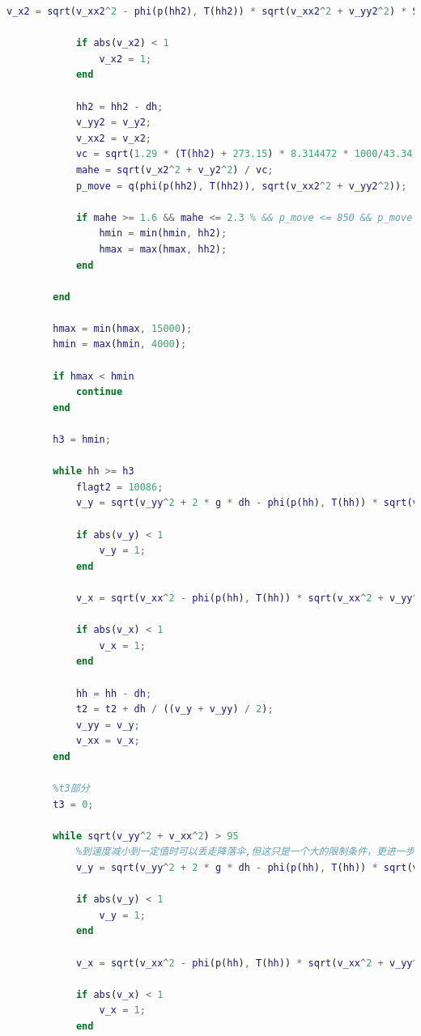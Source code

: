 \documentclass[hyperref,a4paper,UTF8]{ctexart}
\begin{document}
\begin{lstlisting}[language=Matlab]
            v_x2 = sqrt(v_xx2^2 - phi(p(hh2), T(hh2)) * sqrt(v_xx2^2 + v_yy2^2) * S_floor * dh * v_xx2^2 / (m * v_yy2));

            if abs(v_x2) < 1
                v_x2 = 1;
            end

            hh2 = hh2 - dh;
            v_yy2 = v_y2;
            v_xx2 = v_x2;
            vc = sqrt(1.29 * (T(hh2) + 273.15) * 8.314472 * 1000/43.34);
            mahe = sqrt(v_x2^2 + v_y2^2) / vc;
            p_move = q(phi(p(hh2), T(hh2)), sqrt(v_xx2^2 + v_yy2^2));

            if mahe >= 1.6 && mahe <= 2.3 % && p_move <= 850 && p_move >= 250
                hmin = min(hmin, hh2);
                hmax = max(hmax, hh2);
            end

        end

        hmax = min(hmax, 15000);
        hmin = max(hmin, 4000);

        if hmax < hmin
            continue
        end

        h3 = hmin;

        while hh >= h3
            flagt2 = 10086;
            v_y = sqrt(v_yy^2 + 2 * g * dh - phi(p(hh), T(hh)) * sqrt(v_yy^2 + v_xx^2) * S_floor * dh * v_yy / m);

            if abs(v_y) < 1
                v_y = 1;
            end

            v_x = sqrt(v_xx^2 - phi(p(hh), T(hh)) * sqrt(v_xx^2 + v_yy^2) * S_floor * dh * v_xx^2 / (m * v_yy));

            if abs(v_x) < 1
                v_x = 1;
            end

            hh = hh - dh;
            t2 = t2 + dh / ((v_y + v_yy) / 2);
            v_yy = v_y;
            v_xx = v_x;
        end

        %t3部分
        t3 = 0;

        while sqrt(v_yy^2 + v_xx^2) > 95
            %到速度减小到一定值时可以丢走降落伞,但这只是一个大的限制条件，更进一步的条件是马赫数
            v_y = sqrt(v_yy^2 + 2 * g * dh - phi(p(hh), T(hh)) * sqrt(v_yy^2 + v_xx^2) * (S_floor + S_para) * dh * v_yy / m);

            if abs(v_y) < 1
                v_y = 1;
            end

            v_x = sqrt(v_xx^2 - phi(p(hh), T(hh)) * sqrt(v_xx^2 + v_yy^2) * (S_floor + S_para) * dh * v_xx^2 / (m * v_yy));

            if abs(v_x) < 1
                v_x = 1;
            end


\end{lstlisting}
\end{document}
